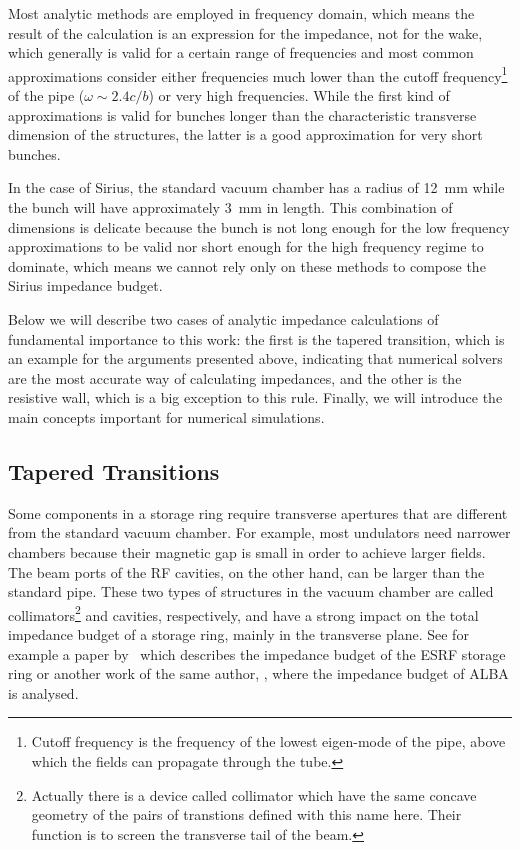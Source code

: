     Most analytic methods are employed in frequency domain, which means the result of the calculation is an expression for the impedance, not for the wake, which generally is valid for a certain range of frequencies and most common approximations consider either frequencies much lower than the cutoff frequency\footnote{Cutoff frequency is the frequency of the lowest eigen-mode of the pipe, above which the fields can propagate through the tube.} of the pipe ($\omega\sim2.4c/b$) or very high frequencies. While the first kind of approximations is valid for bunches longer than the characteristic transverse dimension of the structures, the latter is a good approximation for very short bunches.

    In the case of Sirius, the standard vacuum chamber has a radius of \SI{12}{\milli\meter} while the bunch will have approximately \SI{3}{\milli\meter} in length. This combination of dimensions is delicate because the bunch is not long enough for the low frequency approximations to be valid nor short enough for the high frequency regime to dominate, which means we cannot rely only on these methods to compose the Sirius impedance budget.

    Below we will describe two cases of analytic impedance calculations of fundamental importance to this work: the first is the tapered transition, which is an example for the arguments presented above, indicating that numerical solvers are the most accurate way of calculating impedances, and the other is the resistive wall, which is a big exception to this rule. Finally, we will introduce the main concepts important for numerical simulations.

\subsection{Tapered Transitions}\label{ssec:tapered_transitions}

    Some components in a storage ring require transverse apertures that are different from the standard vacuum chamber. For example, most undulators need narrower chambers because their magnetic gap is small in order to achieve larger fields. The beam ports of the RF cavities, on the other hand, can be larger than the standard pipe. These two types of structures in the vacuum chamber are called collimators\footnote{Actually there is a device called collimator which have the same concave geometry of the pairs of transtions defined with this name here. Their function is to screen the transverse tail of the beam.} and cavities, respectively, and have a strong impact on the total impedance budget of a storage ring, mainly in the transverse plane. See for example a paper by~ which describes the impedance budget of the ESRF storage ring or another work of the same author, , where the impedance budget of ALBA is analysed.

